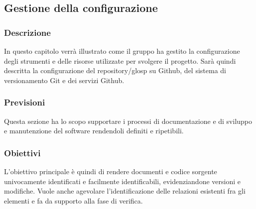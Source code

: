 \subsection{Gestione della configurazione}
	\subsubsection{Descrizione}
		In questo capitolo verrà illustrato come il gruppo ha gestito la configurazione degli strumenti e delle risorse utilizzate per svolgere il progetto.
		Sarà quindi descritta la configurazione del repository/glosp su Github, del sistema di versionamento Git e dei servizi Github.
	\subsubsection{Previsioni}
		Questa sezione ha lo scopo supportare i processi di documentazione e di sviluppo e manutenzione del software rendendoli definiti e ripetibili.  
	\subsubsection{Obiettivi} 
		L'obiettivo principale è quindi di rendere documenti e codice sorgente univocamente identificati e facilmente identificabili, evidenziandone versioni e modifiche. Vuole anche agevolare l'identificazione delle relazioni esistenti fra gli elementi e fa da supporto alla fase di verifica.
